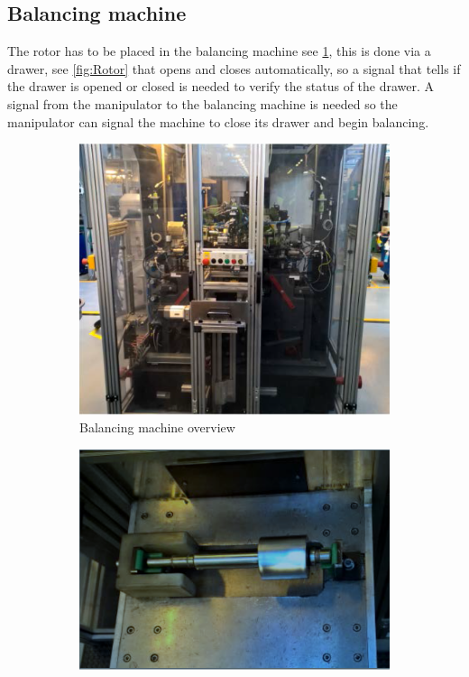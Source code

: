 \subsection{Balancing machine}
 The rotor has to be placed in the balancing machine see \ref{fig:balancing}, this is done via a drawer, see \ref{fig:Rotor} that opens and closes automatically, so a signal that tells if the drawer is opened or closed is needed to verify the status of the drawer. A signal from the manipulator to the balancing machine is needed so the manipulator can signal the machine to close its drawer and begin balancing.\\
 
\begin{figure}[H]
\centering
    \begin{subfigure}{.49\textwidth}
        \centering
        \includegraphics[width=\textwidth]{InitialProblemstatement/Case/balancing.PNG} 
        \caption{Balancing machine overview}
        \label{fig:balancing}
    \end{subfigure}
    \begin{subfigure}{.49\textwidth}
        \centering
        \includegraphics[width=\textwidth]{InitialProblemstatement/Case/Rotor.PNG}

\end{subfigure}
\end{figure}
